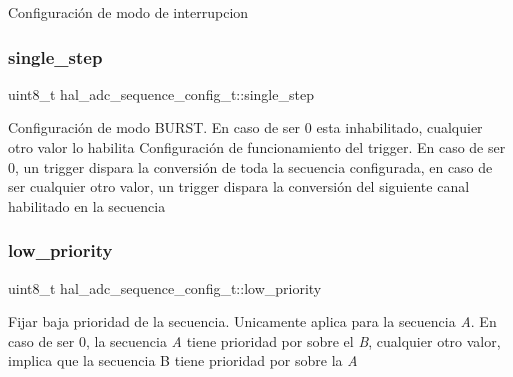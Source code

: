 Configuración de modo de interrupcion \mbox{\label{structhal__adc__sequence__config__t_ac70813667637a3ee24db9f7f2606d87b}} 
\subsubsection{\texorpdfstring{single\+\_\+step}{single\_step}}
{\footnotesize\ttfamily uint8\+\_\+t hal\+\_\+adc\+\_\+sequence\+\_\+config\+\_\+t\+::single\+\_\+step}

Configuración de modo B\+U\+R\+ST. En caso de ser 0 esta inhabilitado, cualquier otro valor lo habilita Configuración de funcionamiento del trigger. En caso de ser 0, un trigger dispara la conversión de toda la secuencia configurada, en caso de ser cualquier otro valor, un trigger dispara la conversión del siguiente canal habilitado en la secuencia \mbox{\label{structhal__adc__sequence__config__t_a1dc8fcb4920ed109389a6391e8c1c9ef}} 
\subsubsection{\texorpdfstring{low\+\_\+priority}{low\_priority}}
{\footnotesize\ttfamily uint8\+\_\+t hal\+\_\+adc\+\_\+sequence\+\_\+config\+\_\+t\+::low\+\_\+priority}

Fijar baja prioridad de la secuencia. Unicamente aplica para la secuencia {\itshape A}. En caso de ser 0, la secuencia {\itshape A} tiene prioridad por sobre el {\itshape B}, cualquier otro valor, implica que la secuencia B tiene prioridad por sobre la {\itshape A} \mbox{\label{structhal__adc__sequence__config__t_a42710517a48ebba1b95e66e9f005cf7d}} 
